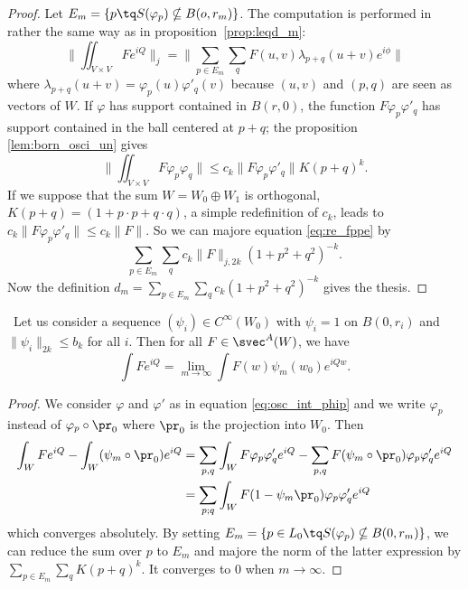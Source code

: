 \begin{proof}
	Let $E_m=\{ p\tq S(\varphi_p)\nsubseteq B(o,r_m) \}$. The computation is performed in rather the same way as in proposition~\ref{prop:leqd_m}:
	\begin{equation}  \label{eq:re_fppe}
		\| \iint_{V\times V}Fe^{iQ} \|_j=\| \sum_{p\in E_m}\sum_q F(u,v)\lambda_{p+q}(u+v)e^{i\phi}  \|
	\end{equation}
	where $\lambda_{p+q}(u+v)=\varphi_p(u)\varphi'_q(v)$ because $(u,v)$ and $(p,q)$ are seen as vectors of $W$. If $\varphi$ has support contained in $B(r,0)$, the function $F\varphi_p\varphi'_q$ has support contained in the ball centered at $p+q$; the proposition
	\ref{lem:born_osci_un} gives
	\[
		\| \iint_{V\times V}F\varphi_p\varphi_q \|\leq c_k\| F\varphi_p\varphi'_q \|K(p+q)^k.
	\]
	If we suppose that the sum $W=W_0\oplus W_1$ is orthogonal, $K(p+q)=(1+p\cdot p+q\cdot q)$, a simple redefinition of $c_k$, leads to $c_k\| F\varphi_p\varphi'_q \|\leq c_k\| F \|$. So we can majore equation \eqref{eq:re_fppe} by
	\[
		\sum_{p\in E_m}\sum_qc_k\| F \|_{j,2k}(1+p^2+q^2)^{-k}.
	\]
	Now the definition $d_m=\sum_{p\in E_m}\sum_qc_k(1+p^2+q^2)^{-k}$ gives the thesis.
\end{proof}

\begin{proposition}\
	Let us consider a sequence $(\psi_i)\in C^{\infty}(W_0)$ with $\psi_i=1$ on $B(0,r_i)$ and $\| \psi_i \|_{2k}\leq b_k$ for all $i$. Then for all $F\in\svec^A(W)$, we have
	\begin{equation}
		\int Fe^{iQ}=\lim_{m\to\infty}\int F(w)\psi_m(w_0)e^{iQw}.
	\end{equation}

\end{proposition}


\begin{proof}
	We consider $\varphi$ and $\varphi'$ as in equation \eqref{eq:osc_int_phip} and we write $\varphi_p$ instead of $\varphi_p\circ\pr_0$ where $\pr_0$ is the projection into $W_0$. Then
	\begin{equation}
		\begin{split}
			\int_WFe^{iQ}-\int_W(\psi_m\circ\pr_0)e^{iQ}&=\sum_{p,q}\int_WF\varphi_p\varphi'_qe^{iQ}
			-\sum_{p,q}F(\psi_m\circ\pr_0)\varphi_p\varphi'_qe^{iQ}\\
			&=\sum_{p;q}\int_WF(1-\psi_m\pr_0)\varphi_p\varphi'_qe^{iQ}
		\end{split}
	\end{equation}
	which converges absolutely. By setting $E_m=\{ p\in L_0\tq S(\varphi_p)\nsubseteq B(0,r_m) \}$, we can reduce the sum over $p$ to $E_m$ and majore the norm of the latter expression by $\sum_{p\in E_m}\sum_qK(p+q)^k$. It converges to $0$ when $m\to \infty$.

\end{proof}

